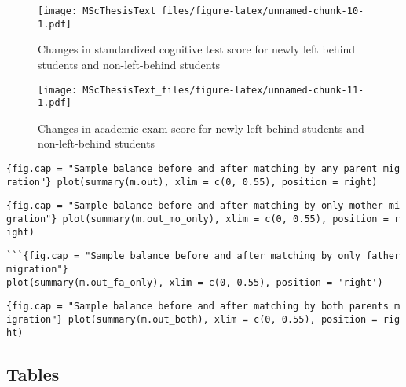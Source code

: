 \documentclass[
  man,floatsintext]{apa7}
\begin{document}
\begin{figure}
\centering
\texttt{[image: MScThesisText\_files/figure-latex/unnamed-chunk-10-1.pdf]}
\caption{\label{fig:unnamed-chunk-10}Changes in standardized cognitive test score for newly left behind students and non-left-behind students}
\end{figure}

\begin{figure}
\centering
\texttt{[image: MScThesisText\_files/figure-latex/unnamed-chunk-11-1.pdf]}
\caption{\label{fig:unnamed-chunk-11}Changes in academic exam score for newly left behind students and non-left-behind students}
\end{figure}

\texttt{\{fig.cap\ =\ "Sample\ balance\ before\ and\ after\ matching\ by\ any\ parent\ migration"\}\ plot(summary(m.out),\ xlim\ =\ c(0,\ 0.55),\ position\ =\ \textquotesingle{}right\textquotesingle{})}

\texttt{\{fig.cap\ =\ "Sample\ balance\ before\ and\ after\ matching\ by\ only\ mother\ migration"\}\ plot(summary(m.out\_mo\_only),\ xlim\ =\ c(0,\ 0.55),\ position\ =\ \textquotesingle{}right\textquotesingle{})}

\begin{verbatim}
```{fig.cap = "Sample balance before and after matching by only father migration"}
plot(summary(m.out_fa_only), xlim = c(0, 0.55), position = 'right')
\end{verbatim}

\texttt{\{fig.cap\ =\ "Sample\ balance\ before\ and\ after\ matching\ by\ both\ parents\ migration"\}\ plot(summary(m.out\_both),\ xlim\ =\ c(0,\ 0.55),\ position\ =\ \textquotesingle{}right\textquotesingle{})}

\hypertarget{tables}{%
\subsection{Tables}\label{tables}}
\end{document}
